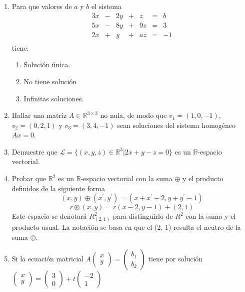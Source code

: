 \documentclass{article}
\begin{document}
\begin{enumerate}
\item Para que valores de $a$ y $b$ el sistema 
\[
\begin{array}{ccccccc}
 3x & - & 2y & + &  z & = &  b  \\
 5x & - & 8y & + & 9z & = &  3  \\
 2x & + &  y & + & az & = & -1  \\
\end{array}
\]
tiene:
\begin{enumerate}
    \item Solución única.
    \item  No tiene solución
    \item Infinitas soluciones.
\end{enumerate}
\item Hallar una matriz $A\in \mathbb{R}^{3\times 3}$ no nula, de modo que $v_1 = (1, 0, -1)$, $v_2 = (0, 2, 1)$ y $v_3 = (3, 4, -1)$ sean soluciones del sistema homogéneo $Ax = 0$.
\item Demuestre que $\mathcal{L} = \{(x, y, z) \in  \mathbb{R}^3 | 2x + y - z = 0\}$ es un $\mathbb{R}$-espacio vectorial.
\item Probar que $\mathbb{R}^2$ es un $\mathbb{R}$-espacio vectorial con la suma $\oplus$ y el producto
definidos de la siguiente forma
\[ (x, y)\oplus
 (x^\prime , y^\prime ) = (x + x^\prime - 2, 
 y + y^\prime - 1) \]
 \[ r \circledast(x, y) = r(x - 2, y - 1) + (2, 1)\]
Este espacio se denotará $R^2_{(2,1)}$ para distinguirlo de $R^2$ con la suma y el producto usual. La notación se basa en que el (2, 1) resulta el neutro de la suma $\oplus$.
 \item Si la ecuación matricial
 $ A \begin{pmatrix}
 x \\ y
 \end{pmatrix}=\begin{pmatrix}
 b_1 \\ b_2 \end{pmatrix}
 $ tiene por solución $\begin{pmatrix}
 x \\ y
 \end{pmatrix}= \begin{pmatrix}
 3 \\ 0
 \end{pmatrix}+t\begin{pmatrix}
 -2 \\ 1
 \end{pmatrix}$
\end{enumerate}
\end{document}
